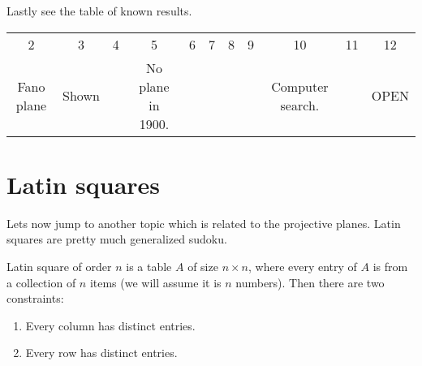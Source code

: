 Lastly see the table of known results.

\begin{table}[!h]\centering
	\begin{tabular}{c | c | c | c | c | c | c | c | c | c | c}
		2 & 3 & 4 & 5 & 6 & 7 & 8 & 9 & 10 & 11 & 12 \\
		Fano plane & Shown & & No plane in 1900. & & & & & Computer search. & & OPEN
	\end{tabular}
\end{table}

\section{Latin squares}

Lets now jump to another topic which is related to the projective planes. Latin squares are pretty much generalized sudoku.

\begin{defn}
	Latin square of order $n$ is a table $A$ of size $n \times n$, where every entry of $A$ is from a collection of $n$ items (we will assume it is $n$ numbers). Then there are two constraints:
	
	\begin{enumerate}
		\item Every column has distinct entries.
		\item Every row has distinct entries.
	\end{enumerate}
\end{defn}


